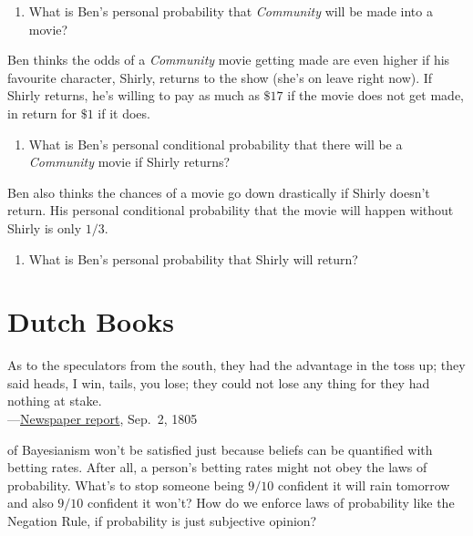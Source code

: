 \documentclass[justified]{tufte-book}
\providecommand{\tightlist}{%
  \setlength{\itemsep}{0pt}\setlength{\parskip}{0pt}}
\newenvironment{epigraph}%
{
\begin{flushright}    
\begin{minipage}{20em}
\begin{flushright}
\itshape
}%
{
\end{flushright}
\end{minipage}
\end{flushright}
}
\theoremstyle{definition}
\theoremstyle{definition}
\theoremstyle{definition}
\theoremstyle{remark}
\begin{document}
\begin{enumerate}
  \begin{enumerate}
  \def\labelenumii{\alph{enumii}.}
  \tightlist
  \item
    What is Ben's personal probability that \emph{Community} will be
    made into a movie?
  \end{enumerate}

  Ben thinks the odds of a \emph{Community} movie getting made are even
  higher if his favourite character, Shirly, returns to the show (she's
  on leave right now). If Shirly returns, he's willing to pay as much as
  \(\$17\) if the movie does not get made, in return for \(\$1\) if it
  does.

  \begin{enumerate}
  \def\labelenumii{\alph{enumii}.}
  \setcounter{enumii}{1}
  \tightlist
  \item
    What is Ben's personal conditional probability that there will be a
    \emph{Community} movie if Shirly returns?
  \end{enumerate}

  Ben also thinks the chances of a movie go down drastically if Shirly
  doesn't return. His personal conditional probability that the movie
  will happen without Shirly is only \(1/3\).

  \begin{enumerate}
  \def\labelenumii{\alph{enumii}.}
  \setcounter{enumii}{3}
  \tightlist
  \item
    What is Ben's personal probability that Shirly will return?
  \end{enumerate}
\end{enumerate}

\hypertarget{dutch-books}{%
\chapter{Dutch Books}\label{dutch-books}}

\begin{epigraph}
As to the speculators from the south, they had the advantage in the toss
up; they said heads, I win, tails, you lose; they could not lose any
thing for they had nothing at stake.\\
---\href{https://chroniclingamerica.loc.gov/lccn/sn83045242/1805-09-02/ed-1/seq-2.pdf}{Newspaper
report}, Sep.~2, 1805
\end{epigraph}

 of Bayesianism won't be satisfied just because
beliefs can be quantified with betting rates. After all, a person's
betting rates might not obey the laws of probability. What's to stop
someone being \(9/10\) confident it will rain tomorrow and also \(9/10\)
confident it won't? How do we enforce laws of probability like the
Negation Rule, if probability is just subjective opinion?
\end{document}
